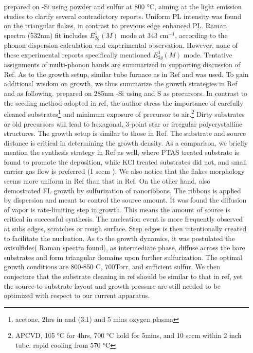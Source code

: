 \citeauthor{Peimyoo2013} prepared  on -Si using  powder and sulfur at 800 \si{\degreeCelsius}, aiming at the light emission studies to clarify several contradictory reports.\cite{Peimyoo2013} Uniform PL intensity was found on the triangular  flakes, in contrast to previous edge enhanced PL.\cite{Berkdemir2013} Raman spectra (532nm) fit includes $E_{2g}^1(M)$ mode at 343 cm$^{-1}$, according to the phonon dispersion calculation \cite{Molina-Sanchez2011} and experimental observation\cite{Zeng2013,Zhao2013,Lee2013}. However, none of these experimental reports specifically mentioned $E_{2g}^1(M)$ mode. Tentative assignments of multi-phonon bands are summarized in supporting discussion of Ref\cite{Zhao2013}. As to the growth setup, similar tube furnace as in Ref \cite{VanderZande2013} and \cite{Najmaei2013} was used. To gain additional wisdom on  growth, we thus summarize the growth strategies in Ref \cite{VanderZande2013} and \cite{Najmaei2013} as following. \citeauthor{VanderZande2013} prepared  on 285nm -Si using  and S as precursors.\cite{VanderZande2013} In contrast to the seeding method adopted in ref\cite{Lee2013,Lee2012b}, the author stress the importance of carefully cleaned substrates\footnote{acetone, 2hrs in  and  (3:1) and 5 mins oxygen plasma} and minimum exposure of precursor to air.\footnote{APCVD, 105 \si{\degreeCelsius} for 4hrs, 700 \si{\degreeCelsius} hold for 5mins, and 10 sccm  within 2 inch tube. rapid cooling from 570 \si{\degreeCelsius}} Dirty substrates or old precursors will lead to hexagonal, 3-point star or irregular polycrystalline structures. The growth setup is similar to those in Ref\cite{Lee2012b}. The substrate and  source distance is critical in determining the growth density. As a comparison, we briefly mention the synthesis strategy in Ref\cite{Lee2013,Lee2012b} as well, where PTAS treated substrate is found to promote the deposition, while KCl treated substrates did not, and small carrier gas flow is preferred (1 sccm ). We also notice that the  flakes morphology seems more uniform in Ref\cite{VanderZande2013} than that in Ref\cite{Lee2012b}. On the other hand, \citeauthor{Najmaei2013} also demostrated  FL growth by sulfurization of  nanoribbons.\cite{Najmaei2013} The ribbons is applied by dispersion and meant to control the source amount. It was found the diffusion of vapor  is rate-limiting step in  growth. This means the amount of source is critical in successful synthesis. The nucleation event is more frequently observed at subs edges, scratches or rough surface. Step edges is then intentionally created to facilitate the nucleation. As to the growth dynamics, it was postulated the oxisulfides( Raman spectra found), as intermediate phase, diffuse across the bare substrates and form triangular domains upon further sulfurization. The optimal growth conditions are 800-850 C, 700Torr, and sufficient sulfur. We then conjecture that the substrate cleaning in ref\cite{Peimyoo2013} should be similar to that in ref\cite{VanderZande2013}, yet the source-to-substrate layout and growth pressure are still needed to be optimized with respect to our current apparatus.


